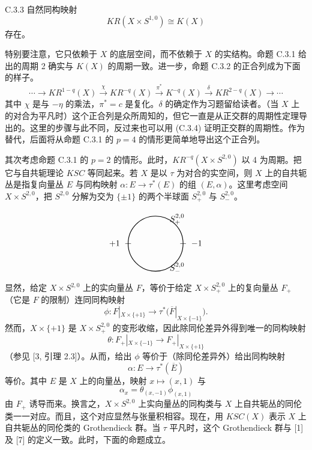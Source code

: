 \begin{proposition*}{C.3.3}
  自然同构映射
  \[
    KR(X\times S^{1,0})\cong K(X)
  \]
  存在。
\end{proposition*}

特别要注意，它只依赖于 $X$ 的底层空间，而不依赖于 $X$ 的实结构。命题 C.3.1 给出的周期 2 确实与 $K(X)$ 的周期一致。进一步，命题 C.3.2 的正合列成为下面的样子。
\begin{equation}
  \cdots\to KR^{1-q}(X)\xrightarrow{\chi} KR^{-q}(X)
  \xrightarrow{\pi^*} K^{-q}(X)\xrightarrow{\delta} KR^{2-q}(X)\to\cdots \tag{C.3.4}
\end{equation}
其中 $\chi$ 是与 $-\eta$ 的乘法，$\pi^*=c$ 是复化。$\delta$ 的确定作为习题留给读者。（当 $X$ 上的对合为平凡时）这个正合列是众所周知的，但它一直是从正交群的周期性定理导出的。这里的步骤与此不同，反过来也可以用 (C.3.4) 证明正交群的周期性。作为替代，后面将从命题 C.3.1 的 $p=4$ 的情形更简单地导出这个正合列。

其次考虑命题 C.3.1 的 $p=2$ 的情形。此时，$KR^{-q}(X\times S^{2,0})$ 以 4 为周期。把它与自共轭理论 $KSC$ 等同起来。若 $X$ 是以 $\tau$ 为对合的实空间，则 $X$ 上的自共轭丛是指复向量丛 $E$ 与同构映射 $\alpha\colon E\to\tau^*(E)$ 的组 $(E,\alpha)$。这里考虑空间 $X\times S^{2,0}$，把 $S^{2,0}$ 分解为交为 $\{\pm 1\}$ 的两个半球面 $S^{2,0}_+$ 与 $S^{2,0}_-$。

\[
\begin{tikzpicture}[baseline=(current bounding box.center),scale=1]
  \draw[thick] (0,0) circle (1.15);
  \draw (-1.15,0) ++(-0.12,0) -- ++(0.24,0);
  \draw (1.15,0) ++(-0.12,0) -- ++(0.24,0);
  \node[left] at (-1.37,0) {$+1$};
  \node[right] at (1.37,0) {$-1$};
  \node at (0.9,1.02) {$S^{2,0}_+$};
  \node at (0.9,-1.02) {$S^{2,0}_-$};
\end{tikzpicture}
\]
显然，给定 $X\times S^{2,0}$ 上的实向量丛 $F$，等价于给定 $X\times S^{2,0}_+$ 上的复向量丛 $F_+$（它是 $F$ 的限制）连同同构映射
\[
  \phi\colon F|_{X\times\{+1\}}\to\tau^*\bigl(\overline{F}|_{X\times\{-1\}}\bigr).
\]
然而，$X\times\{+1\}$ 是 $X\times S^{2,0}_+$ 的变形收缩，因此除同伦差异外得到唯一的同构映射
\[
  \theta\colon F_+|_{X\times\{-1\}}\to F_+|_{X\times\{+1\}}
\]
（参见 [3, 引理 2.3]）。从而，给出 $\phi$ 等价于（除同伦差异外）给出同构映射
\[
  \alpha\colon E\to\tau^*(\overline{E})
\]
等价。其中 $E$ 是 $X$ 上的向量丛，映射 $x\mapsto(x,1)$ 与
\[
  \alpha_x=\theta_{(x,-1)}\phi_{(x,1)}
\]
由 $F_+$ 诱导而来。换言之，$X\times S^{2,0}$ 上实向量丛的同构类与 $X$ 上自共轭丛的同伦类一一对应。而且，这个对应显然与张量积相容。现在，用 $KSC(X)$ 表示 $X$ 上自共轭丛的同伦类的 Grothendieck 群。当 $\tau$ 平凡时，这个 Grothendieck 群与 [1] 及 [7] 的定义一致。此时，下面的命题成立。

